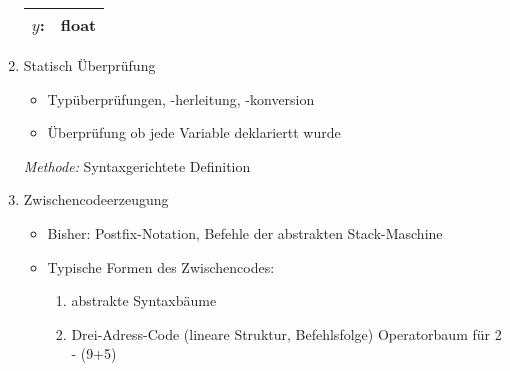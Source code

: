 \begin{enumerate}
\begin{center}
{{{\begin{minipage}{2cm}
                 \begin{tabular}{|rl|}
                  \hline
                  $y$: & \textbf{float}\\\hline
                 \end{tabular}
                \end{minipage}
                }}{
                }
            }
           \end{center}
\item  Statisch Überprüfung
    \begin{itemize}
     \item Typüberprüfungen, -herleitung, -konversion
     \item Überprüfung ob jede Variable deklariertt wurde
    \end{itemize}
    \emph{Methode:} Syntaxgerichtete Definition
\item  Zwischencodeerzeugung
    \begin{itemize}
     \item Bisher: Postfix-Notation, Befehle der abstrakten Stack-Maschine
     \item Typische Formen des Zwischencodes:
         \begin{enumerate}
          \item abstrakte Syntaxbäume
          \item Drei-Adress-Code (lineare Struktur, Befehlsfolge)
          Operatorbaum für 2 - (9+5)
          \begin{center}
\end{center}
\end{enumerate}
\end{itemize}
\end{enumerate}
